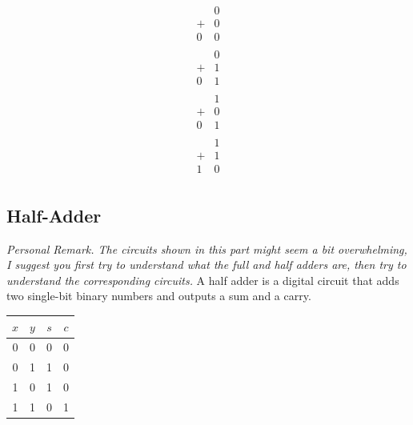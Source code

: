 \documentclass[12pt,openany]{book}
\begin{document}
			      	\[
			      		\begin{array}{cccccc}
			      			  & 0 \\
			      			+ & 0 \\
			      			\hline
			      			0 & 0 \\
			      		\end{array}
			      	\]
			      	\[
			      		\begin{array}{cccccc}
			      			  & 0 \\
			      			+ & 1 \\
			      			\hline
			      			0 & 1 \\
			      		\end{array}
			      	\]
			      	\[
			      		\begin{array}{cccccc}
			      			  & 1 \\
			      			+ & 0 \\
			      			\hline
			      			0 & 1 \\
			      		\end{array}
			      	\]
			      	\[
			      		\begin{array}{cccccc}
			      			  & 1 \\
			      			+ & 1 \\
			      			\hline
			      			1 & 0 \\
			      		\end{array}
			      	\]
			      	
			      	\newpage
			      	\subsection{Half-Adder}
			      	\textit{Personal Remark. The circuits shown in this part might seem a bit overwhelming, I suggest you first try to understand what the full and half adders are, then try to understand the corresponding circuits.} 
			      	\newline
			      	\vspace{10px}
			      	A half adder is a digital circuit that adds two single-bit binary numbers and outputs a sum and a carry. 
			      	
			      	
			      	\begin{table}[h!]
			      		\centering
			      		\begin{tabular}{cccc}
			      			\hline
			      			$x$ & $y$ & $s$ & $c$ \\
			      			\hline
			      			0   & 0   & 0   & 0   \\
			      			0   & 1   & 1   & 0   \\
			      			1   & 0   & 1   & 0   \\
			      			1   & 1   & 0   & 1   \\
			      			\hline
			      		\end{tabular}
			      	\end{table}
			      	
\end{document}
